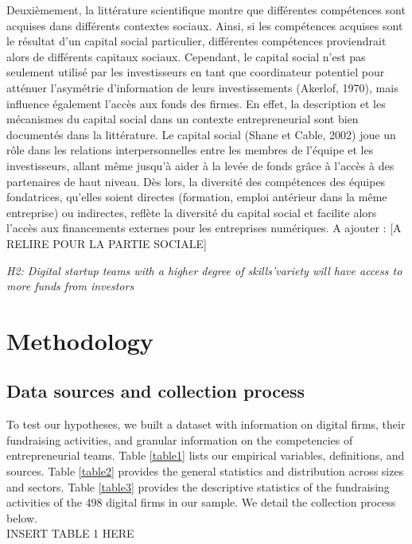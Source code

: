 \documentclass[12pt]{article}
\begin{document}
Deuxièmement, la littérature scientifique montre que différentes compétences sont acquises dans différents contextes sociaux. Ainsi, si les compétences acquises sont le résultat d'un capital social particulier, différentes compétences proviendrait alors de différents capitaux sociaux. Cependant, le capital social n'est pas seulement utilisé par les investisseurs en tant que coordinateur potentiel pour atténuer l'asymétrie d'information de leurs investissements (Akerlof, 1970), mais influence également l'accès aux fonds des firmes. En effet, la description et les mécanismes du capital social dans un contexte entrepreneurial sont bien documentés dans la littérature. Le capital social (Shane et Cable, 2002) joue un rôle dans les relations interpersonnelles entre les membres de l'équipe et les investisseurs, allant même jusqu'à aider à la levée de fonds grâce à l'accès à des partenaires de haut niveau. Dès lors, la diversité des compétences des équipes fondatrices, qu'elles soient directes (formation, emploi antérieur dans la même entreprise) ou indirectes, reflète la diversité du capital social et facilite alors l'accès aux financements externes pour les entreprises numériques. A ajouter : \citep{zhou2015entrepreneurial} [A RELIRE POUR LA PARTIE SOCIALE]

\noindent \textit{H2: Digital startup teams with a higher degree of skills'variety will have access to more funds from investors} \\


\section{Methodology}

\subsection{Data sources and collection process}

To test our hypotheses, we built a dataset with information on digital firms, their fundraising activities, and granular information on the competencies of entrepreneurial teams. Table \ref{table1} lists our empirical variables, definitions, and sources. Table \ref{table2} provides the general statistics and distribution across sizes and sectors. Table \ref{table3} provides the descriptive statistics of the fundraising activities of the 498 digital firms in our sample. We detail the collection process below.\\

INSERT TABLE 1 HERE \\
\end{document}
